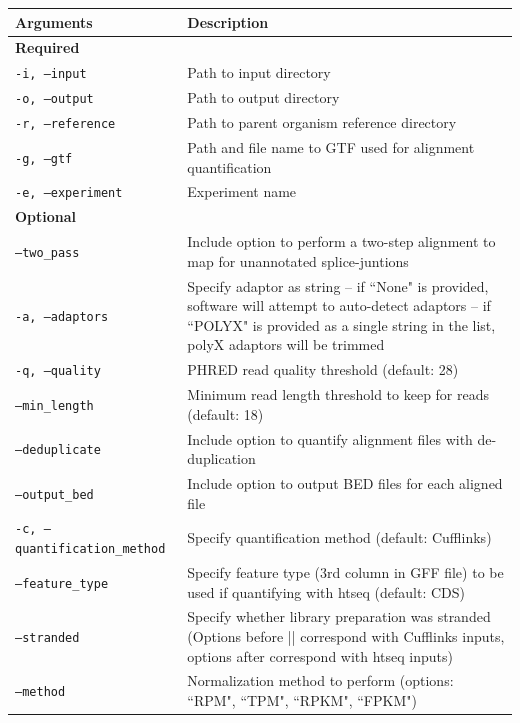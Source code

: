 \documentclass[11pt, a4paper, oneside]{article}
\begin{document}
\begin{tabular}{p{5cm}p{13cm}}
 \textbf{Arguments} & \textbf{Description} \\
 \hline
 \textbf{Required} & \\
 \hline
 \texttt{-i, --input} & Path to input directory \\
 \hline
 \texttt{-o, --output} & Path to output directory \\
 \hline
 \texttt{-r, --reference} & Path to parent organism reference directory \\
 \hline
 \texttt{-g, --gtf} & Path and file name to GTF used for alignment quantification \\
 \hline
 \texttt{-e, --experiment} & Experiment name \\
 \hline
 \textbf{Optional} & \\
 \hline
 \texttt{--two\_pass} & Include option to perform a two-step alignment to map for unannotated splice-juntions \\
 \hline
 \texttt{-a, --adaptors} & Specify adaptor as string -- if ``None" is provided, software will attempt to auto-detect adaptors -- if ``POLYX" is provided as a single string in the list, polyX adaptors will be trimmed \\
 \hline
 \texttt{-q, --quality} & PHRED read quality threshold (default: 28) \\
 \hline
 \texttt{--min\_length} & Minimum read length threshold to keep for reads (default: 18) \\
 \hline
 \texttt{--deduplicate} & Include option to quantify alignment files with de-duplication \\
 \hline
 \texttt{--output\_bed} & Include option to output BED files for each aligned file \\
 \hline
 \texttt{-c, --quantification\_method} & Specify quantification method (default: Cufflinks\cite{cufflinks}) \\
 \hline
 \texttt{--feature\_type} & Specify feature type (3rd column in GFF file) to be used if quantifying with htseq (default: CDS) \\
 \hline
 \texttt{--stranded} & Specify whether library preparation was stranded (Options before || correspond with Cufflinks inputs, options after correspond with htseq inputs) \\
 \hline
 \texttt{--method} & Normalization method to perform (options: ``RPM", ``TPM", ``RPKM", ``FPKM") \\

\end{tabular}
\end{document}
